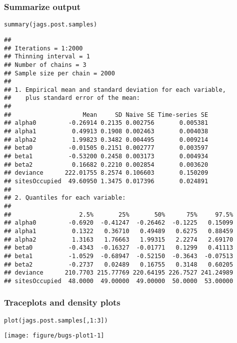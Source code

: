 \documentclass[color=usenames,dvipsnames]{beamer}\usepackage[]{graphicx}\usepackage[]{xcolor}
\makeatletter
\newcommand{\hlnum}[1]{\textcolor[rgb]{0.69,0.494,0}{#1}}%
\newcommand{\hlopt}[1]{\textcolor[rgb]{0,0,0}{#1}}%
\newcommand{\hlstd}[1]{\textcolor[rgb]{0,0,0}{#1}}%
\newcommand{\hlkwd}[1]{\textcolor[rgb]{0.004,0.004,0.506}{#1}}%
\newenvironment{kframe}{%
 \def\at@end@of@kframe{}%
 \ifinner\ifhmode%
  \def\at@end@of@kframe{\end{minipage}}%
  \begin{minipage}{\columnwidth}%
 \fi\fi%
 \def\FrameCommand##1{\hskip\@totalleftmargin \hskip-\fboxsep
 \colorbox{shadecolor}{##1}\hskip-\fboxsep
     \hskip-\linewidth \hskip-\@totalleftmargin \hskip\columnwidth}%
 \MakeFramed {\advance\hsize-\width
   \@totalleftmargin\z@ \linewidth\hsize
   \@setminipage}}%
 {\par\unskip\endMakeFramed%
 \at@end@of@kframe}
\newenvironment{knitrout}{}{} %
\makeatother
\begin{document}
\begin{frame}[fragile]
  \frametitle{Summarize output}
\begin{knitrout}\tiny
{}\color{fgcolor}\begin{kframe}
\begin{alltt}
\hlkwd{summary}\hlstd{(jags.post.samples)}
\end{alltt}
\begin{verbatim}
## 
## Iterations = 1:2000
## Thinning interval = 1 
## Number of chains = 3 
## Sample size per chain = 2000 
## 
## 1. Empirical mean and standard deviation for each variable,
##    plus standard error of the mean:
## 
##                    Mean     SD Naive SE Time-series SE
## alpha0         -0.26914 0.2135 0.002756       0.005381
## alpha1          0.49913 0.1908 0.002463       0.004038
## alpha2          1.99823 0.3482 0.004495       0.009214
## beta0          -0.01505 0.2151 0.002777       0.003597
## beta1          -0.53200 0.2458 0.003173       0.004934
## beta2           0.16682 0.2210 0.002854       0.003620
## deviance      222.01755 8.2574 0.106603       0.150209
## sitesOccupied  49.60950 1.3475 0.017396       0.024891
## 
## 2. Quantiles for each variable:
## 
##                   2.5%       25%       50%      75%     97.5%
## alpha0         -0.6920  -0.41247  -0.26462  -0.1225   0.15099
## alpha1          0.1322   0.36710   0.49489   0.6275   0.88459
## alpha2          1.3163   1.76663   1.99315   2.2274   2.69170
## beta0          -0.4343  -0.16327  -0.01771   0.1299   0.41113
## beta1          -1.0529  -0.68947  -0.52150  -0.3643  -0.07513
## beta2          -0.2737   0.02489   0.16755   0.3148   0.60205
## deviance      210.7703 215.77769 220.64195 226.7527 241.24989
## sitesOccupied  48.0000  49.00000  49.00000  50.0000  53.00000
\end{verbatim}
\end{kframe}
\end{knitrout}
\end{frame}




\begin{frame}[fragile]
  \frametitle{Traceplots and density plots}
\begin{knitrout}\footnotesize
{}\color{fgcolor}\begin{kframe}
\begin{alltt}
\hlkwd{plot}\hlstd{(jags.post.samples[,}\hlnum{1}\hlopt{:}\hlnum{3}\hlstd{])}
\end{alltt}
\end{kframe}

{\centering \texttt{[image: figure/bugs-plot1-1]} 

}


\end{knitrout}
\end{frame}
\end{document}
